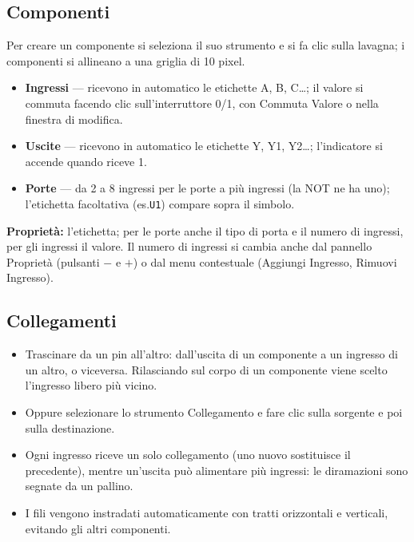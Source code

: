 \documentclass[a4paper,11pt]{article}
\newcommand\mediumweight{\fontseries{mb}\selectfont}
\newcommand\uielement[1]{{\mediumweight #1}}
\begin{document}
\subsection{Componenti}

Per creare un componente si seleziona il suo strumento e si fa clic sulla lavagna; i componenti
si allineano a una griglia di 10 pixel.

\begin{itemize}
  \item \textbf{Ingressi} --- ricevono in automatico le etichette A, B, C\ldots; il valore si
        commuta facendo clic sull'interruttore 0/1, con \uielement{Commuta Valore} o nella
        finestra di modifica.
  \item \textbf{Uscite} --- ricevono in automatico le etichette Y, Y1, Y2\ldots; l'indicatore si
        accende quando riceve 1.
  \item \textbf{Porte} --- da 2 a 8 ingressi per le porte a più ingressi (la NOT ne ha uno);
        l'etichetta facoltativa (es.\@ \texttt{U1}) compare sopra il simbolo.
\end{itemize}

\textbf{Proprietà:} l'etichetta; per le porte anche il tipo di porta e il numero di ingressi,
per gli ingressi il valore. Il numero di ingressi si cambia anche dal pannello Proprietà
(pulsanti $-$ e $+$) o dal menu contestuale (\uielement{Aggiungi Ingresso},
\uielement{Rimuovi Ingresso}).

\subsection{Collegamenti}

\begin{itemize}
  \item Trascinare da un pin all'altro: dall'uscita di un componente a un ingresso di un altro, o
        viceversa. Rilasciando sul corpo di un componente viene scelto l'ingresso libero più
        vicino.
  \item Oppure selezionare lo strumento \uielement{Collegamento} e fare clic sulla sorgente e poi
        sulla destinazione.
  \item Ogni ingresso riceve un solo collegamento (uno nuovo sostituisce il precedente), mentre
        un'uscita può alimentare più ingressi: le diramazioni sono segnate da un pallino.
  \item I fili vengono instradati automaticamente con tratti orizzontali e verticali, evitando gli
        altri componenti.
\end{itemize}
\end{document}
